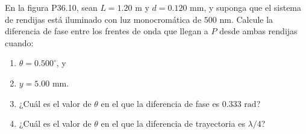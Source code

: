 \item En la figura P36.10, sean $L = 1.20\text{ m}$ y $d = 0.120\text{ mm}$, y suponga que el sistema de rendijas está iluminado con luz monocromática de $500\text{ nm}$. Calcule la diferencia de fase entre los frentes de onda que llegan a $P$ desde ambas rendijas cuando:
\begin{enumerate}
    \item $\theta = 0.500^\circ$, y
    \item $y = 5.00\text{ mm}$.
    \item ¿Cuál es el valor de $\theta$ en el que la diferencia de fase es $0.333\text{ rad}$?
    \item ¿Cuál es el valor de $\theta$ en el que la diferencia de trayectoria es $\lambda/4$?
\end{enumerate}